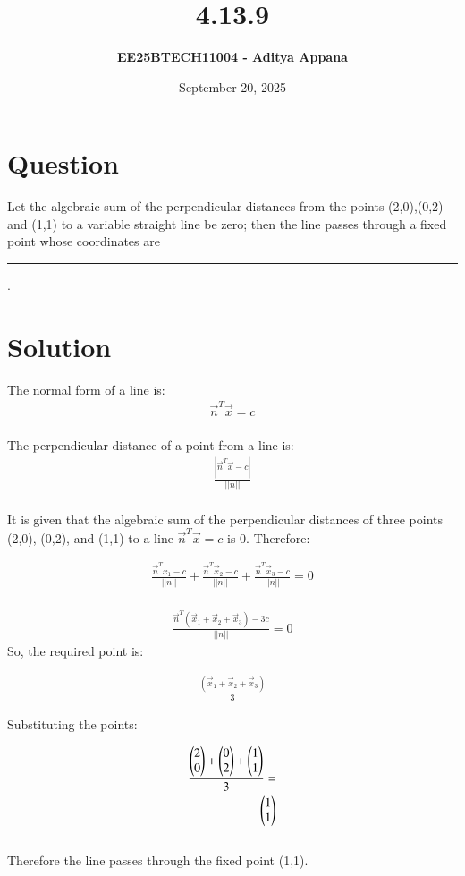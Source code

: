 \documentclass[12pt]{article}
\title{\textbf{4.13.9}}
\author{\textbf{EE25BTECH11004 - Aditya Appana}}
\date{September 20, 2025}
\begin{document}
\maketitle

\section*{Question}
Let the algebraic sum of the perpendicular distances from the points (2,0),(0,2) and
(1,1) to a variable straight line be zero; then the line passes through a fixed point
whose coordinates are \rule{1.5cm}{0.15mm}.

\section*{Solution}

The normal form of a line is:
\begin{align}
\vec{n}^T\vec{x} = c
\end{align}\\
The perpendicular distance of a point from a line is:
\begin{align}
\frac{|\vec{n}^T\vec{x} - c|}{||n||}
\end{align}\\
It is given that the algebraic sum of the perpendicular distances of three points (2,0), (0,2), and (1,1) to a line $\vec{n}^T\vec{x} = c$ is 0. Therefore:

\begin{align}
\frac{\vec{n}^Tx_1 - c}{||n||} + \frac{\vec{n}^T\vec{x}_2 - c}{||n||} + \frac{\vec{n}^T\vec{x}_3 - c}{||n||} = 0
\end{align}\\

\begin{align}
\frac{\vec{n}^T(\vec{x}_1 +\vec{x}_2+ \vec{x}_3)- 3c}{||n||} = 0
\end{align}
So, the required point is:

\begin{align}
\frac{(\vec{x}_1 +\vec{x}_2+ \vec{x}_3)}{3}
\end{align}

Substituting the points:

\begin{align}
\frac{\begin{pmatrix}2\\0\end{pmatrix} + \begin{pmatrix}0\\2\end{pmatrix} + \begin{pmatrix}1\\1\end{pmatrix} }{3} =\\
\begin{pmatrix}1\\1\end{pmatrix}
\end{align}\\
Therefore the line passes through the fixed point (1,1).
\end{document}
